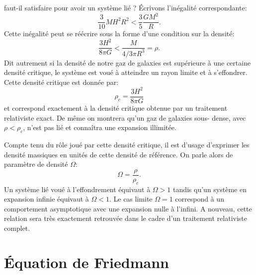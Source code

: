  faut-il satisfaire pour avoir un système lié ? Écrivons l'inégalité correspondante:
\begin{equation}
\frac{3}{10} M H^2 R^2 <\frac{3}{5}\frac{GM^2}{R}.
\end{equation}
Cette inégalité peut se réécrire sous la forme d'une condition sur la densité:
\begin{equation}
\frac{3H^2}{8\pi G}< \frac{M}{4/3\pi R^3}=\rho.
\end{equation}
Dit autrement si la densité de notre gaz de galaxies est supérieure à une certaine densité critique, le système est voué à atteindre un rayon limite et à s'effondrer. Cette densité critique  est donnée par:
\begin{equation}
\rho_c =\frac{3H^2}{8\pi G}
\end{equation}
et correspond exactement à la densité critique obtenue par un traitement relativiste exact. De même on montrera qu'un gaz de galaxies sous- dense, avec $\rho< \rho_c$, n'est pas lié et  connaîtra une expansion illimitée. 

Compte tenu du rôle joué par cette densité critique, il est d'usage d'exprimer les densité massiques en unités de cette densité de référence. On parle alors de paramètre de densité  $\Omega$:
\begin{equation}
\Omega=\frac{\rho}{\rho_c}.
\end{equation}
Un système lié voué à l'effondrement équivaut à $\Omega>1$ tandis qu'un système en expansion infinie équivaut à $\Omega<1$. Le cas limite $\Omega=1$ correspond à un comportement asymptotique avec une expansion nulle à l'infini. A nouveau, cette relation sera très exactement retrouvée dans le cadre d'un traitement relativiste complet.

\section{Équation de Friedmann}

